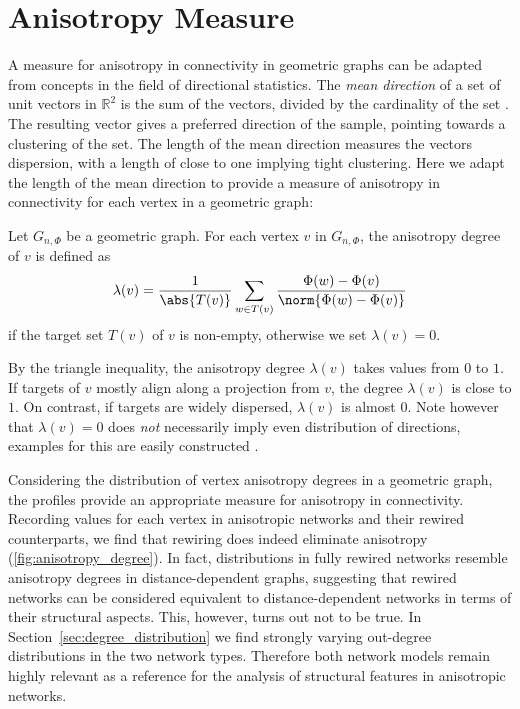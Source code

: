 




\section{Anisotropy Measure}\label{sec:anisotropy_measure}

A measure for anisotropy in connectivity in geometric graphs can be
adapted from concepts in the field of directional statistics. The
\textit{mean direction} of a set of unit vectors in $\mathbb{R}^2$ is
the sum of the vectors, divided by the cardinality of the
set \parencite[cf.][]{Mardia_Directional-statistics}. The resulting
vector gives a preferred direction of the sample, pointing towards a
clustering of the set. The length of the mean direction measures the
vectors dispersion, with a length of close to one implying tight
clustering. Here we adapt the length of the mean direction to provide
a measure of anisotropy in connectivity for each vertex in a geometric
graph:


\begin{definition}
Let $G_{n, \Phi}$ be a geometric graph. For each vertex $v$ in $G_{n,
  \Phi}$, the anisotropy degree of $v$ is defined as
\[
\lambda(v) =         \frac{1}{\abs{T(v)}} \sum_{w \in T(v)}
\frac{\Phi(w)-\Phi(v)}{\norm{\Phi(w)-\Phi(v)}}
\]
if the target set $T(v)$ of $v$ is non-empty, otherwise we set
$\lambda(v) = 0$.
\end{definition}

By the triangle inequality, the anisotropy degree $\lambda(v)$ takes
values from $0$ to $1$. If targets of $v$ mostly align along a
projection from $v$, the degree $\lambda(v)$ is close to $1$. On
contrast, if targets are widely dispersed, $\lambda(v)$ is almost
$0$. Note however that $\lambda(v) = 0$ does \textit{not} necessarily
imply even distribution of directions, examples for this are easily
constructed \parencite[cf.][]{Mardia_Directional-statistics}.

Considering the distribution of vertex anisotropy degrees in a
geometric graph, the profiles provide an appropriate measure for
anisotropy in connectivity. Recording values for each vertex in
anisotropic networks and their rewired counterparts, we find that
rewiring does indeed eliminate anisotropy
(\autoref{fig:anisotropy_degree}). In fact, distributions in fully
rewired networks resemble anisotropy degrees in distance-dependent
graphs, suggesting that rewired networks can be considered equivalent
to distance-dependent networks in terms of their structural
aspects. This, however, turns out not to be true. In
Section~\ref{sec:degree_distribution} we find strongly varying
out-degree distributions in the two network types. Therefore both
network models remain highly relevant as a reference for the analysis
of structural features in anisotropic networks.

